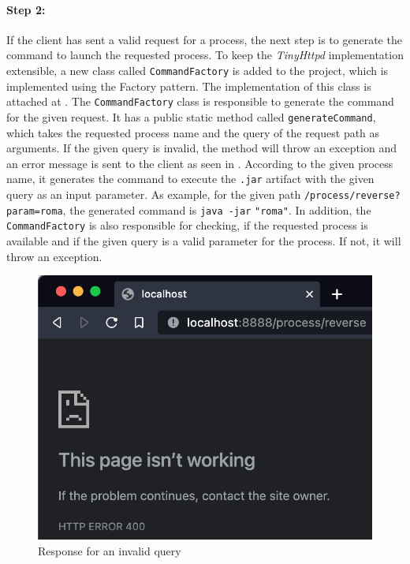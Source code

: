 \paragraph{Step 2:}
If the client has sent a valid request for a process, the next step is to generate the command to launch the requested process. To keep the \textit{TinyHttpd} implementation extensible, a new class called \texttt{CommandFactory} is added to the project, which is implemented using the Factory pattern. The implementation of this class is attached at .
The \texttt{CommandFactory} class is responsible to generate the command for the given request. It has a public static method called \texttt{generateCommand}, which takes the requested process name and the query of the request path as arguments. If the given query is invalid, the method will throw an exception and an error message is sent to the client as seen in .
According to the given process name, it generates the command to execute the \texttt{.jar} artifact with the given query as an input parameter.
As example, for the given path \texttt{/process/reverse?param=roma}, the generated command is \texttt{java -jar}  \texttt{"roma"}. In addition, the \texttt{CommandFactory} is also responsible for checking, if the requested process is available and if the given query is a valid parameter for the process. If not, it will throw an exception.

\begin{figure}[h]
\centering
\includegraphics[scale=0.4]{images/invalidQuery}
\caption{Response for an invalid query}
\label{fig:01_part1_impl_tinyhttpd_invalidquery}
\end{figure}


